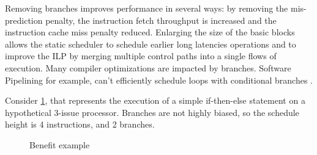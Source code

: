 Removing branches improves performance in several ways: by removing the mis-prediction penalty, the instruction fetch throughput is increased and the instruction cache miss penalty reduced. Enlarging the size of the basic blocks allows the static scheduler to schedule earlier long latencies operations and to improve the ILP by merging multiple control paths into a single flows of execution. Many compiler optimizations are impacted by branches. Software Pipelining for example, can't efficiently schedule loops with conditional branches \cite{Warter:1992:EMS:144953.145796}.

Consider \ref{fig:example1}, that represents the execution of a simple if-then-else statement on a hypothetical 3-issue processor. Branches are not highly biased, so the schedule height is 4 instructions, and 2 branches.

\begin{figure}
  \centering
\caption{Benefit example}
\label{fig:example1}
\end{figure}


